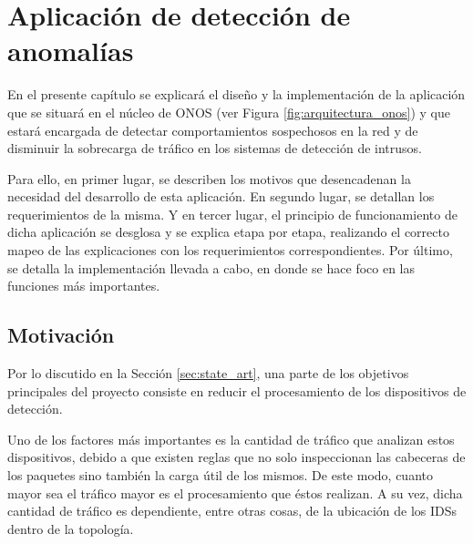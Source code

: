 \chapter{Aplicación de detección de anomalías} %

\label{sec:Chapter4} %

En el presente capítulo se explicará el diseño y la implementación de la
aplicación que se situará en el núcleo de ONOS (ver Figura
\ref{fig:arquitectura_onos}) y que estará encargada de detectar comportamientos
sospechosos en la red y de disminuir la sobrecarga de tráfico en los sistemas de
detección de intrusos.

Para ello, en primer lugar, se describen los motivos que desencadenan la
necesidad del desarrollo de esta aplicación. En segundo lugar, se detallan los
requerimientos de la misma. Y en tercer lugar, el principio de funcionamiento de
dicha aplicación se desglosa y se explica etapa por etapa, realizando el
correcto mapeo de las explicaciones con los requerimientos correspondientes. Por
último, se detalla la implementación llevada a cabo, en donde se hace foco en
las funciones más importantes.

\section{Motivación} \label{sec:motivacion_app_4}

Por lo discutido en la Sección \ref{sec:state_art}, una parte de los objetivos
principales del proyecto consiste en reducir el procesamiento de los
dispositivos de detección.

Uno de los factores más importantes es la cantidad de tráfico que analizan estos
dispositivos, debido a que existen reglas que no solo inspeccionan las cabeceras
de los paquetes sino también la carga útil de los mismos. De este modo, cuanto
mayor sea el tráfico mayor es el procesamiento que éstos realizan. A su vez,
dicha cantidad de tráfico es dependiente, entre otras cosas, de la ubicación de
los IDSs dentro de la topología.


